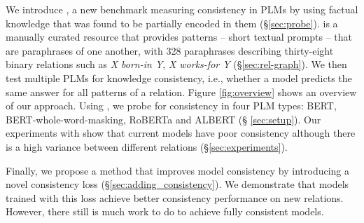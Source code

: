 We introduce \resource{}, a new benchmark  measuring
consistency in PLMs by using factual knowledge that was found to be partially encoded in them (\S \ref{sec:probe}).
\resource{} is a manually curated resource
that provides patterns -- short textual prompts -- that are paraphrases of one another, with 328 paraphrases describing thirty-eight binary relations such as \textit{X born-in Y}, \textit{X works-for Y} (\S \ref{sec:rel-graph}).
We then test multiple PLMs for knowledge consistency, i.e., whether
a model  predicts the same answer for all patterns of a relation.
Figure \ref{fig:overview} shows an overview of our approach.
Using \resource{}, we probe for consistency in four PLM
types: BERT, BERT-whole-word-masking, RoBERTa and ALBERT (\S
\ref{sec:setup}).
Our experiments with \resource{} show that
current models have poor consistency although there is a high variance between different relations (\S \ref{sec:experiments}). 

Finally, we propose a method that improves model consistency
by introducing a novel consistency loss
(\S \ref{sec:adding_consistency}). We demonstrate that models trained with this
loss achieve better consistency
performance on new relations. However, there still is much
work to do to achieve fully consistent models.







